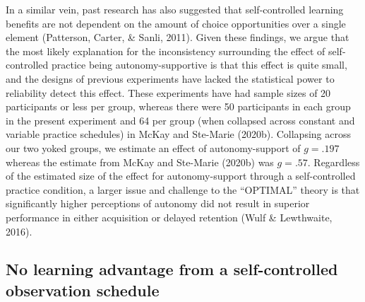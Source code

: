 \documentclass[
  english,
  doc, donotrepeattitle,floatsintext]{apa7}
\begin{document}
In a similar vein, past research has also suggested that self-controlled learning benefits are not dependent on the amount of choice opportunities over a single element (Patterson, Carter, \& Sanli, 2011). Given these findings, we argue that the most likely explanation for the inconsistency surrounding the effect of self-controlled practice being autonomy-supportive is that this effect is quite small, and the designs of previous experiments have lacked the statistical power to reliability detect this effect. These experiments have had sample sizes of 20 participants or less per group, whereas there were 50 participants in each group in the present experiment and 64 per group (when collapsed across constant and variable practice schedules) in McKay and Ste-Marie (2020b). Collapsing across our two yoked groups, we estimate an effect of autonomy-support of \(g = .197\) whereas the estimate from McKay and Ste-Marie (2020b) was \(g = .57\). Regardless of the estimated size of the effect for autonomy-support through a self-controlled practice condition, a larger issue and challenge to the ``OPTIMAL'' theory is that significantly higher perceptions of autonomy did not result in superior performance in either acquisition or delayed retention (Wulf \& Lewthwaite, 2016).

\hypertarget{no-learning-advantage-from-a-self-controlled-observation-schedule}{%
\subsection{No learning advantage from a self-controlled observation schedule}\label{no-learning-advantage-from-a-self-controlled-observation-schedule}}
\end{document}
